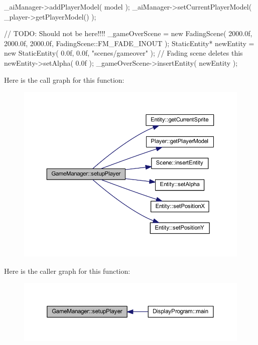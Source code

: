 \begin{DoxyCode}
{        _aiManager->addPlayerModel( model );
        _aiManager->setCurrentPlayerModel( _player->getPlayerModel() );

        // TODO: Should not be here!!!!
        _gameOverScene = new FadingScene( 2000.0f, 2000.0f, 2000.0f, 
      FadingScene::FM_FADE_INOUT );
        StaticEntity* newEntity = new StaticEntity( 0.0f, 0.0f, "scenes/gameover"
       ); // Fading scene deletes this
        newEntity->setAlpha( 0.0f );
        _gameOverScene->insertEntity( newEntity );
}
\end{DoxyCode}


Here is the call graph for this function:
\nopagebreak
\begin{figure}[H]
\begin{center}
\leavevmode
\includegraphics[width=374pt]{db/d10/class_game_manager_a84cb7228bfaed0b6a5c2f8f0b280daff_cgraph}
\end{center}
\end{figure}




Here is the caller graph for this function:
\nopagebreak
\begin{figure}[H]
\begin{center}
\leavevmode
\includegraphics[width=368pt]{db/d10/class_game_manager_a84cb7228bfaed0b6a5c2f8f0b280daff_icgraph}
\end{center}
\end{figure}


